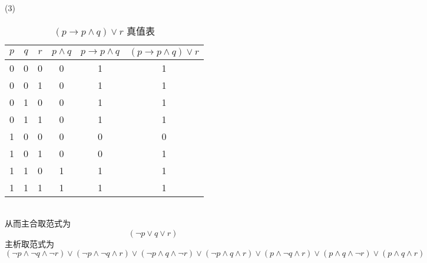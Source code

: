 \documentclass{article}
\begin{document}
\newpage 
(3)
\begin{table}[h!]
  \begin{center}
    \caption{$(p \to p \wedge q) \vee r$ 真值表}
    \setlength{\tabcolsep}{8mm} {
    \begin{tabular}{|c|c|c|c|c|c|} 
      \textbf{$p$} & \textbf{$q$} & \textbf{$r$} & \textbf{$p \wedge q$} & \textbf{$p \to p \wedge q$} & \textbf{$(p \to p \wedge q) \vee r$}\\
      \hline
      0 & 0 & 0 & 0 & 1 & 1\\
      0 & 0 & 1 & 0 & 1 & 1\\
      0 & 1 & 0 & 0 & 1 & 1\\
      0 & 1 & 1 & 0 & 1 & 1\\
      1 & 0 & 0 & 0 & 0 & 0\\
      1 & 0 & 1 & 0 & 0 & 1\\
      1 & 1 & 0 & 1 & 1 & 1\\
      1 & 1 & 1 & 1 & 1 & 1\\
    \end{tabular} }
  \end{center}
\end{table}
\\
从而主合取范式为
\[
(\neg p \vee q \vee r)  
\]
主析取范式为
\[
(\neg p \wedge \neg q \wedge \neg r) \vee (\neg p \wedge \neg q \wedge r) \vee 
(\neg p \wedge q \wedge \neg r) \vee (\neg p \wedge q \wedge r) \vee (p \wedge \neg q \wedge r) \vee
(p \wedge q \wedge \neg r) \vee (p \wedge q \wedge r)
\]
\end{document}
